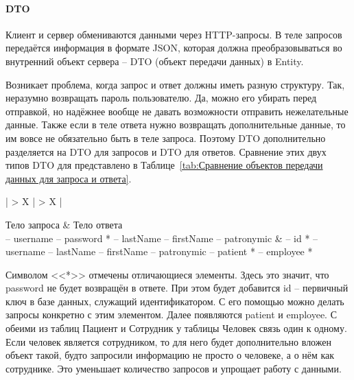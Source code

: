 \documentclass[a4paper,article]{article}
\begin{document}
\begin{sloppypar}
    \paragraph{DTO}\label{Реализация. Сервер. DTO}

    Клиент и сервер обмениваются данными через HTTP-запросы. В теле запросов передаётся информация в формате JSON, которая должна преобразовываться во внутренний объект сервера -- DTO (объект передачи данных) в Entity.

    Возникает проблема, когда запрос и ответ должны иметь разную структуру. Так, неразумно возвращать пароль пользователю. Да, можно его убирать перед отправкой, но надёжнее вообще не давать возможности отправить нежелательные данные. Также если в теле ответа нужно возвращать дополнительные данные, то им вовсе не обязательно быть в теле запроса. Поэтому DTO дополнительно разделяется на DTO для запросов и DTO для ответов. Сравнение этих двух типов DTO для  представлено в Таблице~\ref{tab:Сравнение объектов передачи данных для запроса и ответа}.

    \begin{xltabular}{\textwidth} { |
        >{\hsize} X |
        >{\hsize} X | }

        \hline
        Тело запроса
        & Тело ответа \\

        \hline
        -- username \newline -- password * \newline -- lastName \newline -- firstName \newline -- patronymic
        & -- id * \newline -- username \newline -- lastName \newline -- firstName \newline -- patronymic \newline -- patient * \newline -- employee * \\

        \hline

        \caption{\centering Сравнение объектов передачи данных для запроса и ответа}

        \label{tab:Сравнение объектов передачи данных для запроса и ответа}
    \end{xltabular}

    Символом <<*>> отмечены отличающиеся элементы. Здесь это значит, что password не будет возвращён в ответе. При этом будет добавится id -- первичный ключ в базе данных, служащий идентификатором. С его помощью можно делать запросы конкретно с этим элементом. Далее появляются patient и employee. С обеими из таблиц Пациент и Сотрудник у таблицы Человек связь один к одному. Если человек является сотрудником, то для него будет дополнительно вложен объект такой, будто запросили информацию не просто о человеке, а о нём как сотруднике. Это уменьшает количество запросов и упрощает работу с данными.


\end{sloppypar}
\end{document}
